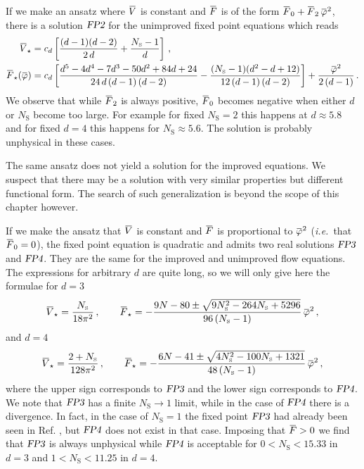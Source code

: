 \documentclass[11pt]{book}
\newcommand{\overbar}[1]{\mkern 1.5mu\overline{\mkern-1.5mu#1\mkern-1.5mu}\mkern 1.5mu}
\newcommand\NS{ N_{\scriptscriptstyle{\mathrm{S}}} }
\newcommand{\FPtwo}  {\textsl{FP2}}
\newcommand{\FPthree}{\textsl{FP3}}
\newcommand{\FPfour} {\textsl{FP4}}
\newcommand{\bV}{\overbar V}
\newcommand{\bF}{\overbar F}
\newcommand{\bVstar}{\bV_\star}
\newcommand{\bFstar}{\bF_\star}
\newcommand{\bp}{\overbar \varphi}
\newcommand\ie{\textit{i.e.}\ }
\numberwithin{equation}{chapter}
\begin{document}
If we make an ansatz where $\bV$ is constant and $\bF$ is of the
form $\bF_0 + \bF_2 \, \bp^2$, there is a solution $\FPtwo$
for the unimproved fixed point equations which reads
\begin{align}
  \bVstar          &= c_d \left[\frac{(d-1) (d-2)}{2 \, d}+\frac{\NS-1}{d}\right] \,, \\
  \bFstar(\bp) &= c_d \left[ \frac{d^5-4 d^4-7 d^3-50 d^2+84 d+24}{24 \, d \, (d-1) \, (d-2)}
                  - \frac{(\NS-1)(d^2-d+12)}{12 \, (d-1) \, (d-2)}\right]
                  + \frac{\bp^2}{2 \, (d-1)}\,.
\end{align}
We observe that while $\bF_2$ is always positive,
$\bF_0$ becomes negative when either $d$ or $\NS$ become
too large. For example for fixed $\NS=2$ this happens at $d\approx 5.8$
and for fixed $d=4$ this happens for $\NS\approx 5.6$.
The solution is probably unphysical in these cases.

The same ansatz does not yield a solution for the improved equations.
We suspect that there may be a solution
with very similar properties but different functional form.
The search of such generalization is beyond the scope of this chapter however.

If we make the ansatz that $\bV$ is constant and $\bF$ is proportional
to $\bp^2$ (\ie that $\bF_0=0$), the fixed point equation is quadratic and admits two
real solutions $\FPthree$ and $\FPfour$.
They are the same for the improved and unimproved flow equations.
The expressions for arbitrary $d$ are quite long, so
we will only give here the formulae for $d=3$
\begin{align}
  \bVstar = \frac{\NS}{18\pi^2} \,, \qquad
  \bFstar = - \frac{ 9N - 80 \pm \sqrt{9\NS^2-264\NS+5296} }{ 96 \, (\NS-1) } \, \bp^2 \,,
\end{align}
and $d=4$
\begin{align}
  \bVstar = \frac{2+\NS}{128\pi^2} \,, \qquad
  \bFstar = - \frac{ 6N - 41 \pm \sqrt{4\NS^2-100\NS+1321} }{ 48 \, (\NS-1) } \, \bp^2 \,,
\end{align}
where the upper sign corresponds to $\FPthree$
and the lower sign corresponds to $\FPfour$.
We note that $\FPthree$ has a finite $\NS\to1$ limit,
while in the case of $\FPfour$ there is a divergence.
In fact, in the case of $\NS=1$ the fixed point $\FPthree$ had already been seen
in Ref. \cite{Percacci:2015wwa}, but $\FPfour$ does not exist in that case.
Imposing that $\bF>0$ we find that $\FPthree$ is always unphysical
while $\FPfour$ is acceptable for $0<\NS<15.33$ in $d=3$
and $1<\NS<11.25$ in $d=4$.
\end{document}

